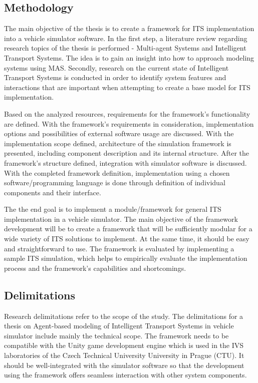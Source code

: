 \documentclass[titlepage, 12pt]{article}
\begin{document}

\subsection{Methodology}

The main objective of the thesis is to create a framework for ITS implementation into a vehicle simulator software. 
In the first step, a literature review regarding research topics of the thesis is performed - Multi-agent Systems and 
Intelligent Transport Systems. The idea is to gain an insight into how to approach modeling systems using 
MAS. Secondly, research on the current state of Intelligent Transport Systems is conducted in 
order to identify system features and interactions that are important when attempting to create a 
base model for ITS implementation. 

Based on the analyzed resources, requirements for the framework's functionality are defined.
With the framework's requirements in consideration, implementation options and possibilities of
external software usage are discussed.  With the implementation scope defined, architecture of
the simulation framework is presented, including component description and its internal structure.
After the framework's structure defined, integration with simulator software is discussed. 
With the completed framework definition, implementation using a chosen software/programming language
is done through definition of individual components and their interface. 

The the end goal is to implement a module/framework for general ITS implementation in a vehicle simulator. 
The main objective of the framework development will be to create a framework that will be sufficiently modular for 
a wide variety of ITS solutions to implement. At the same time, it should be easy and
straightforward to use. The framework is evaluated by implementing a sample ITS simulation,
which helps to empirically evaluate the implementation process and the framework's capabilities
and shortcomings.

\subsection{Delimitations}

Research delimitations refer to the scope of the study. The delimitations for a thesis on
Agent-based modeling of Intelligent Transport Systems in vehicle simulator include mainly the
technical scope. The framework needs to be compatible with the Unity game development
engine which is used in the IVS laboratories of the Czech Technical University University in
Prague (CTU). It should be well-integrated with the simulator software so that the development
using the framework offers seamless interaction with other system components. 
\end{document}

